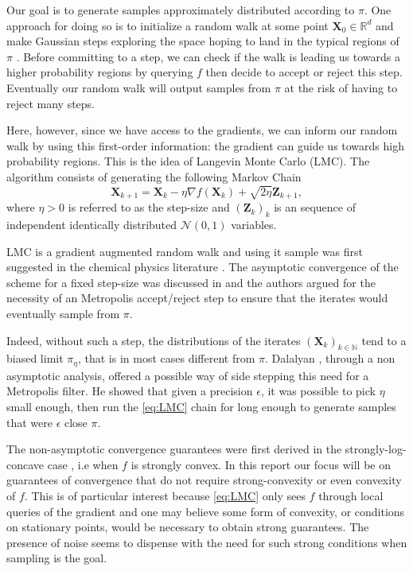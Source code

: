 \documentclass[11pt,twoside]{article}
\theoremstyle{definition}
\newcommand{\R}{\mathbb{R}}
\newcommand{\bX}{\mathbf{X}}
\begin{document}
Our goal is to generate samples approximately distributed according to $\pi$. One approach for doing so is to initialize a random walk at some point $\bX_0 \in \R^d$ and make Gaussian steps exploring the space hoping to land in the typical regions of $\pi$ \cite{sherlock_random_2010}. Before committing to a step, we can check if the walk is leading us towards a higher probability regions by querying $f$ then decide to accept or reject this step. Eventually our random walk will output samples from $\pi$ at the risk of having to reject many steps. 

Here, however, since we have access to the gradients, we can inform our random walk by using this first-order information: the gradient can guide us towards high probability regions. This is the idea of Langevin Monte Carlo (LMC). The algorithm consists of generating the following Markov Chain 
\begin{equation}
\bX_{k+1} = \bX_k - \eta \nabla f(\bX_k) + \sqrt{2\eta}\mathbf{Z}_{k+1},
\label{eq:LMC}
\tag{LMC}
\end{equation}
where $\eta > 0$ is referred to as the step-size and $(\mathbf{Z}_k)_k$ is an sequence of independent identically distributed $\mathcal{N}(0, 1)$ variables.

LMC is a gradient augmented random walk and using it sample was first suggested in the chemical physics literature \cite{rossky_brownian_1978}. The asymptotic convergence of the scheme for a fixed step-size was discussed in \cite{roberts_exponential_1996} and the authors argued for the necessity of an Metropolis accept/reject step to ensure that the iterates would eventually sample from $\pi$.

Indeed, without such a step, the distributions of the iterates $(\bX_k)_{k\in \mathbb{N}}$ tend to a biased limit $\pi_\eta$, that is in most cases different from $\pi$. Dalalyan \cite{dalalyan_theoretical_2016}, through a non asymptotic analysis, offered a possible way of side stepping this need for a Metropolis filter. He showed that given a precision $\epsilon$, it was possible to pick $\eta$ small enough, then run the \eqref{eq:LMC} chain for long enough to generate samples that were $\epsilon$ close $\pi$.

The non-asymptotic convergence guarantees were first derived in the strongly-log-concave case \cite{dalalyan_theoretical_2016}, i.e when $f$ is strongly convex. In this report our focus will be on guarantees of convergence that do not require strong-convexity or even convexity of $f$. This is of particular interest because \eqref{eq:LMC} only sees $f$ through local queries of the gradient and one may believe some form of convexity, or conditions on stationary points, would be necessary to obtain strong guarantees. The presence of noise seems to dispense with the need for such strong conditions when sampling is the goal.
\end{document}
